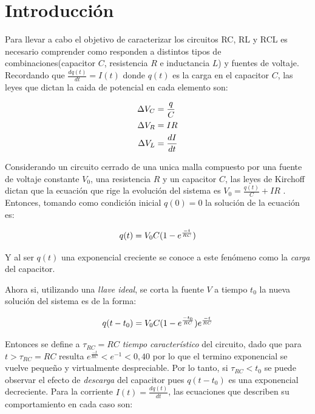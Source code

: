 \documentclass[11pt,a4paper]{article}
\begin{document}
\section{Introducción}\label{sec:intro}
Para llevar a cabo el objetivo de caracterizar los circuitos RC, RL y RCL es necesario comprender como responden a distintos tipos de combinaciones(capacitor $C$, resistencia $R$ e inductancia $L$) y fuentes de voltaje. Recordando que $\frac{dq(t)}{dt} = I(t)$ donde $q(t)$ es la carga en el capacitor $C$, las leyes que dictan la caida de potencial en cada elemento son:

\begin{equation}{\label{leyes}}
\begin{split}
\Delta V_C &= \frac{q}{C}\\
\Delta V_R &= IR\\
\Delta V_L &= \frac{dI}{dt}
\end{split}
\end{equation}

Considerando un circuito cerrado de una unica malla compuesto por una fuente de voltaje constante $V_{0}$, una resistencia $R$ y un capacitor $C$, las leyes de Kirchoff dictan que la ecuación que rige la evolución del sistema es $V_{0} = \frac{q(t)}{C}+IR$ \cite{Trelles}. Entonces, tomando como condición inicial $q(0)=0$ la solución de la ecuación es:
   
\begin{equation}{\label{RC_carga}}
q(t)=V_{0}C(1-e^\frac{-t}{RC})
\end{equation}

Y al ser $q(t)$ una exponencial creciente se conoce a este fenómeno como la \textit{carga} del capacitor.

Ahora si, utilizando una \textit{llave ideal}, se corta la fuente $V$ a tiempo $t_{0}$ la nueva solución del sistema es de la forma:

\begin{equation}{\label{RC_descarga}}
q(t-t_{0})=V_{0}C(1-e^\frac{-t_{0}}{RC})e^\frac{-t}{RC}
\end{equation}

Entonces se define a $\tau_{RC}=RC$ \textit{tiempo característico} del circuito, dado que para $t>\tau_{RC}=RC$ resulta $e^\frac{-t}{RC}<e^{-1}<0,40$ por lo que el termino exponencial se vuelve pequeño y virtualmente despreciable. Por lo tanto, si $\tau_{RC}<t_{0}$ se puede observar el efecto de \textit{descarga} del capacitor pues $q(t-t_{0})$ es una exponencial decreciente. Para la corriente $I(t) = \frac{dq(t)}{dt}$, las ecuaciones que describen su comportamiento en cada caso son:
\end{document}
